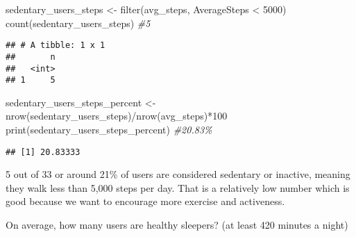 \documentclass[
]{article}
\newenvironment{Shaded}{\begin{snugshade}}{\end{snugshade}}
\newcommand{\AttributeTok}[1]{\textcolor[rgb]{0.77,0.63,0.00}{#1}}
\newcommand{\CommentTok}[1]{\textcolor[rgb]{0.56,0.35,0.01}{\textit{#1}}}
\newcommand{\ConstantTok}[1]{\textcolor[rgb]{0.00,0.00,0.00}{#1}}
\newcommand{\DecValTok}[1]{\textcolor[rgb]{0.00,0.00,0.81}{#1}}
\newcommand{\FunctionTok}[1]{\textcolor[rgb]{0.00,0.00,0.00}{#1}}
\newcommand{\NormalTok}[1]{#1}
\newcommand{\OtherTok}[1]{\textcolor[rgb]{0.56,0.35,0.01}{#1}}
\newcommand{\SpecialCharTok}[1]{\textcolor[rgb]{0.00,0.00,0.00}{#1}}
\begin{document}
\begin{Shaded}
\begin{Highlighting}[]
\NormalTok{sedentary\_users\_steps }\OtherTok{\textless{}{-}} \FunctionTok{filter}\NormalTok{(avg\_steps, AverageSteps }\SpecialCharTok{\textless{}} \DecValTok{5000}\NormalTok{)}
\FunctionTok{count}\NormalTok{(sedentary\_users\_steps) }\CommentTok{\#5}
\end{Highlighting}
\end{Shaded}

\begin{verbatim}
## # A tibble: 1 x 1
##       n
##   <int>
## 1     5
\end{verbatim}

\begin{Shaded}
\begin{Highlighting}[]
\NormalTok{sedentary\_users\_steps\_percent }\OtherTok{\textless{}{-}} \FunctionTok{nrow}\NormalTok{(sedentary\_users\_steps)}\SpecialCharTok{/}\FunctionTok{nrow}\NormalTok{(avg\_steps)}\SpecialCharTok{*}\DecValTok{100}
\FunctionTok{print}\NormalTok{(sedentary\_users\_steps\_percent) }\CommentTok{\#20.83\%}
\end{Highlighting}
\end{Shaded}

\begin{verbatim}
## [1] 20.83333
\end{verbatim}

5 out of 33 or around 21\% of users are considered sedentary or
inactive, meaning they walk less than 5,000 steps per day. That is a
relatively low number which is good because we want to encourage more
exercise and activeness.

On average, how many users are healthy sleepers? (at least 420 minutes a
night)

\begin{Shaded}
\end{Shaded}
\end{document}
